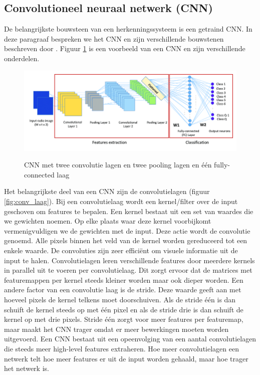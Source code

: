 \subsection{Convolutioneel neuraal netwerk (CNN) }
De belangrijkste bouwsteen van een herkenningssysteem is een getraind CNN.
In deze paragraaf bespreken we het CNN en zijn verschillende bouwstenen beschreven door \cite{jiang_deep_2019}.
Figuur \ref{fig:cnn} is een voorbeeld van een CNN en zijn verschillende onderdelen.

\begin{figure}[!ht]
    \centering
 	\includegraphics[width=0.85\linewidth]{fig/cnn_2.png}
 	\caption{CNN met twee convolutie lagen en twee pooling lagen en \'e\'en fully-connected laag}
 	\label{fig:cnn}
	 \cite{s19143127}
\end{figure}
 
Het belangrijkste deel van een CNN zijn de convolutielagen (figuur \ref{fig:conv_laag}). 
Bij een convolutielaag wordt een kernel/filter over de input geschoven om features te bepalen. 
Een kernel bestaat uit een set van waardes die we gewichten noemen.
Op elke plaats waar deze kernel voorbijkomt vermenigvuldigen we de gewichten met de input.
Deze actie wordt de convolutie genoemd.
Alle pixels binnen het veld van de kernel worden gereduceerd tot een enkele waarde. 
De convoluties zijn zeer effici\"ent om visuele informatie uit de input te halen.
Convolutielagen leren verschillende features door meerdere kernels in parallel uit te voeren per convolutielaag. 
Dit zorgt ervoor dat de matrices met featuremappen per kernel steeds kleiner worden maar ook dieper worden. 
Een andere factor van een convolutie laag is de stride.
Deze waarde geeft aan met hoeveel pixels de kernel telkens moet doorschuiven. 
Als de stride \'e\'en is dan schuift de kernel steeds op met \'e\'en pixel en als de stride drie is dan schuift de kernel op met drie pixels.
Stride \'e\'en zorgt voor meer features per featuremap, maar maakt het CNN trager omdat er meer bewerkingen moeten worden uitgevoerd.
Een CNN bestaat uit een opeenvolging van een aantal convolutielagen die steeds meer high-level features extraheren. 
Hoe meer convolutielagen een netwerk telt hoe meer features er uit de input worden gehaald, maar hoe trager het netwerk is. 

